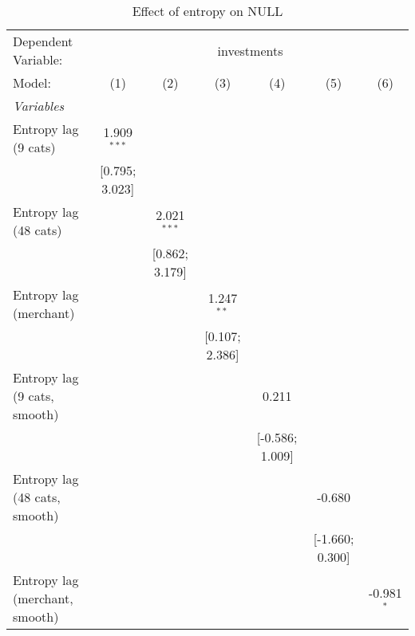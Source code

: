 
\begin{table}[htbp]
   \centering
   \tiny
   \begin{threeparttable}[b]
      \caption{\label{tab:reg_investments_cnz} Effect of entropy on NULL}
      \begin{tabular}{lcccccc}
         \tabularnewline \midrule \midrule
         Dependent Variable: & \multicolumn{6}{c}{investments}\\
         Model:                         & (1)             & (2)             & (3)             & (4)             & (5)             & (6)\\  
         \midrule
         \emph{Variables}\\
         Entropy lag (9 cats)           & 1.909$^{***}$   &                 &                 &                 &                 &   \\   
                                        & [0.795; 3.023]  &                 &                 &                 &                 &   \\   
         Entropy lag (48 cats)          &                 & 2.021$^{***}$   &                 &                 &                 &   \\   
                                        &                 & [0.862; 3.179]  &                 &                 &                 &   \\   
         Entropy lag (merchant)         &                 &                 & 1.247$^{**}$    &                 &                 &   \\   
                                        &                 &                 & [0.107; 2.386]  &                 &                 &   \\   
         Entropy lag (9 cats, smooth)   &                 &                 &                 & 0.211           &                 &   \\   
                                        &                 &                 &                 & [-0.586; 1.009] &                 &   \\   
         Entropy lag (48 cats, smooth)  &                 &                 &                 &                 & -0.680          &   \\   
                                        &                 &                 &                 &                 & [-1.660; 0.300] &   \\   
         Entropy lag (merchant, smooth) &                 &                 &                 &                 &                 & -0.981$^{*}$\\   

\end{tabular}
\end{threeparttable}
\end{table}
